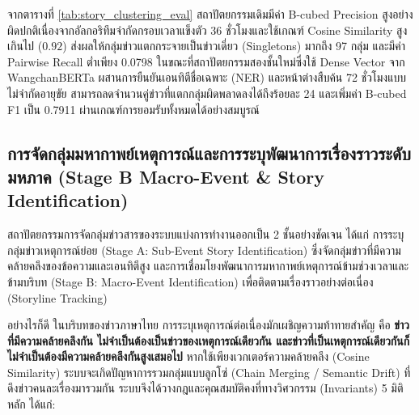 จากตารางที่ \ref{tab:story_clustering_eval} สถาปัตยกรรมเดิมมีค่า B-cubed Precision สูงอย่างผิดปกติเนื่องจากอัลกอริทึมจำกัดกรอบเวลาแข็งตัว 36 ชั่วโมงและใช้เกณฑ์ Cosine Similarity สูงเกินไป ($0.92$) ส่งผลให้กลุ่มข่าวแตกกระจายเป็นข่าวเดี่ยว (Singletons) มากถึง 97 กลุ่ม และมีค่า Pairwise Recall ต่ำเพียง 0.0798 ในขณะที่สถาปัตยกรรมสองชั้นใหม่ซึ่งใช้ Dense Vector จาก WangchanBERTa ผสานการยืนยันเอนทิตีชื่อเฉพาะ (NER) และหน้าต่างสืบค้น 72 ชั่วโมงแบบไม่จำกัดอายุขัย สามารถลดจำนวนคู่ข่าวที่แตกกลุ่มผิดพลาดลงได้ถึงร้อยละ 24 และเพิ่มค่า B-cubed F1 เป็น 0.7911 ผ่านเกณฑ์การยอมรับทั้งหมดได้อย่างสมบูรณ์


\subsection{การจัดกลุ่มมหากาพย์เหตุการณ์และการระบุพัฒนาการเรื่องราวระดับมหภาค (Stage B Macro-Event \& Story Identification)}

สถาปัตยกรรมการจัดกลุ่มข่าวสารของระบบแบ่งการทำงานออกเป็น 2 ชั้นอย่างชัดเจน ได้แก่ การระบุกลุ่มข่าวเหตุการณ์ย่อย (Stage A: Sub-Event Story Identification) ซึ่งจัดกลุ่มข่าวที่มีความคล้ายคลึงของข้อความและเอนทิตีสูง และการเชื่อมโยงพัฒนาการมหากาพย์เหตุการณ์ข้ามช่วงเวลาและข้ามบริบท (Stage B: Macro-Event Identification) เพื่อติดตามเรื่องราวอย่างต่อเนื่อง (Storyline Tracking)

อย่างไรก็ดี ในบริบทของข่าวภาษาไทย การระบุเหตุการณ์ต่อเนื่องมักเผชิญความท้าทายสำคัญ คือ \textbf{ข่าวที่มีความคล้ายคลึงกัน ไม่จำเป็นต้องเป็นข่าวของเหตุการณ์เดียวกัน และข่าวที่เป็นเหตุการณ์เดียวกันก็ไม่จำเป็นต้องมีความคล้ายคลึงกันสูงเสมอไป} หากใช้เพียงเวกเตอร์ความคล้ายคลึง (Cosine Similarity) ระบบจะเกิดปัญหาการรวมกลุ่มแบบลูกโซ่ (Chain Merging / Semantic Drift) ที่ดึงข่าวคนละเรื่องมารวมกัน ระบบจึงได้วางกฎและคุณสมบัติคงที่ทางวิศวกรรม (Invariants) 5 มิติหลัก ได้แก่:

